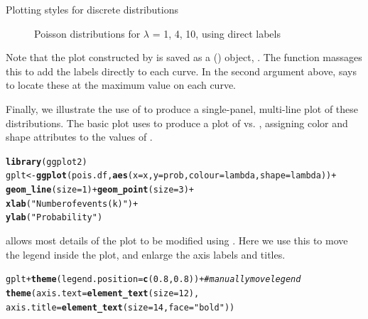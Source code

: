 \documentclass[11pt]{book}\usepackage[]{graphicx}\usepackage[]{color}
\makeatletter
\newcommand{\hlnum}[1]{\textcolor[rgb]{0.686,0.059,0.569}{#1}}%
\newcommand{\hlstr}[1]{\textcolor[rgb]{0.192,0.494,0.8}{#1}}%
\newcommand{\hlcom}[1]{\textcolor[rgb]{0.678,0.584,0.686}{\textit{#1}}}%
\newcommand{\hlopt}[1]{\textcolor[rgb]{0,0,0}{#1}}%
\newcommand{\hlstd}[1]{\textcolor[rgb]{0.345,0.345,0.345}{#1}}%
\newcommand{\hlkwb}[1]{\textcolor[rgb]{0.69,0.353,0.396}{#1}}%
\newcommand{\hlkwc}[1]{\textcolor[rgb]{0.333,0.667,0.333}{#1}}%
\newcommand{\hlkwd}[1]{\textcolor[rgb]{0.737,0.353,0.396}{\textbf{#1}}}%
\newenvironment{kframe}{%
 \def\at@end@of@kframe{}%
 \ifinner\ifhmode%
  \def\at@end@of@kframe{\end{minipage}}%
  \begin{minipage}{\columnwidth}%
 \fi\fi%
 \def\FrameCommand##1{\hskip\@totalleftmargin \hskip-\fboxsep
 \colorbox{shadecolor}{##1}\hskip-\fboxsep
     \hskip-\linewidth \hskip-\@totalleftmargin \hskip\columnwidth}%
 \MakeFramed {\advance\hsize-\width
   \@totalleftmargin\z@ \linewidth\hsize
   \@setminipage}}%
 {\par\unskip\endMakeFramed%
 \at@end@of@kframe}
\newenvironment{knitrout}{}{} %
\renewenvironment{knitrout}{\small\renewcommand{\baselinestretch}{.85}}{} %
\makeatother
\begin{document}
\begin{Example}{Plotting styles for discrete distributions}
\begin{knitrout}
\begin{figure}[htbp]
\caption[Poisson distributions for $\lambda$ = 1, 4, 10, using direct labels]{Poisson distributions for $\lambda$ = 1, 4, 10, using direct labels\label{fig:dpois-xyplot2}}
\end{figure}


\end{knitrout}

Note that the plot constructed by  is saved as a
() object, .  The function
massages this to add the labels directly to each curve.  In the
second argument above,  says to locate these
at the maximum value on each curve.

Finally, we illustrate the use of  to produce a single-panel,
multi-line plot of these distributions. The basic plot uses
 to produce a plot of  vs. ,
assigning color and shape attributes to the values of .

\begin{knitrout}
\color{fgcolor}\begin{kframe}
\begin{alltt}
\hlkwd{library}\hlstd{(ggplot2)}
\hlstd{gplt} \hlkwb{<-} \hlkwd{ggplot}\hlstd{(pois.df,} \hlkwd{aes}\hlstd{(}\hlkwc{x}\hlstd{=x,} \hlkwc{y}\hlstd{=prob,} \hlkwc{colour}\hlstd{=lambda,} \hlkwc{shape}\hlstd{=lambda))} \hlopt{+}
  \hlkwd{geom_line}\hlstd{(}\hlkwc{size}\hlstd{=}\hlnum{1}\hlstd{)} \hlopt{+} \hlkwd{geom_point}\hlstd{(}\hlkwc{size}\hlstd{=}\hlnum{3}\hlstd{)} \hlopt{+}
        \hlkwd{xlab}\hlstd{(}\hlstr{"Number of events (k)"}\hlstd{)} \hlopt{+}
        \hlkwd{ylab}\hlstd{(}\hlstr{"Probability"}\hlstd{)}
\end{alltt}
\end{kframe}
\end{knitrout}

 allows most details of the plot to be modified using
.  Here we use this to move the legend inside the plot,
and enlarge the axis labels and titles.
\begin{knitrout}
\color{fgcolor}\begin{kframe}
\begin{alltt}
\hlstd{gplt} \hlopt{+} \hlkwd{theme}\hlstd{(}\hlkwc{legend.position}\hlstd{=}\hlkwd{c}\hlstd{(}\hlnum{0.8}\hlstd{,}\hlnum{0.8}\hlstd{))} \hlopt{+}  \hlcom{# manually move legend}
       \hlkwd{theme}\hlstd{(}\hlkwc{axis.text}\hlstd{=}\hlkwd{element_text}\hlstd{(}\hlkwc{size}\hlstd{=}\hlnum{12}\hlstd{),}
            \hlkwc{axis.title}\hlstd{=}\hlkwd{element_text}\hlstd{(}\hlkwc{size}\hlstd{=}\hlnum{14}\hlstd{,}\hlkwc{face}\hlstd{=}\hlstr{"bold"}\hlstd{))}
\end{alltt}
\end{kframe}\begin{figure}[htbp]



\end{figure}
\end{knitrout}
\end{Example}
\end{document}
